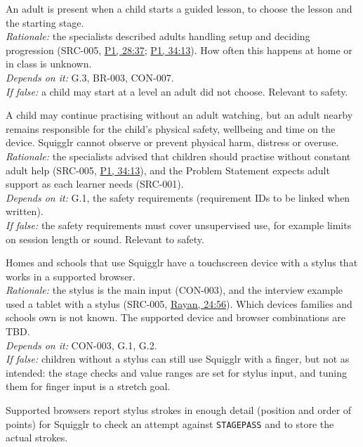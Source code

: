 \documentclass[12pt]{article}
\renewcommand{\_}{\textunderscore\allowbreak}%
\newcommand{\intlink}[3]{\hyperref[int:#1-#2]{#3}}
\newcommand{\intref}[2]{\intlink{#1}{#2}{#1, #2}}
\begin{document}
\begin{description}[style=nextline]
\item[ASM-001] An adult is present when a child starts a guided lesson, to
choose the lesson and the starting stage.\\
\emph{Rationale:} the specialists described adults handling setup and deciding
progression (SRC-005, \intref{P1}{28:37}; \intref{P1}{34:13}). How often this
happens at home or in class is unknown.\\
\emph{Depends on it:} G.3, BR-003, CON-007.\\
\emph{If false:} a child may start at a level an adult did not choose. Relevant
to safety.
\item[ASM-002] A child may continue practising without an adult watching, but an
adult nearby remains responsible for the child's physical safety, wellbeing and
time on the device. Squigglr cannot observe or prevent physical harm, distress
or overuse.\\
\emph{Rationale:} the specialists advised that children should practise without
constant adult help (SRC-005, \intref{P1}{34:13}), and the Problem Statement
expects adult support as each learner needs (SRC-001).\\
\emph{Depends on it:} G.1, the safety requirements (requirement IDs to be linked
when written).\\
\emph{If false:} the safety requirements must cover unsupervised use, for
example limits on session length or sound. Relevant to safety.
\item[ASM-003] Homes and schools that use Squigglr have a touchscreen device
with a stylus that works in a supported browser.\\
\emph{Rationale:} the stylus is the main input (CON-003), and the interview
example used a tablet with a stylus (SRC-005, \intref{Rayan}{24:56}). Which
devices families and schools own is not known. The supported device and browser
combinations are TBD.\\
\emph{Depends on it:} CON-003, G.1, G.2.\\
\emph{If false:} children without a stylus can still use Squigglr with a finger,
but not as intended: the stage checks and value ranges are set for stylus input,
and tuning them for finger input is a stretch goal.
\item[ASM-004] Supported browsers report stylus strokes in enough detail
(position and order of points) for Squigglr to check an attempt against
\texttt{STAGE\_PASS} and to store the actual strokes.\\

\end{description}
\end{document}
